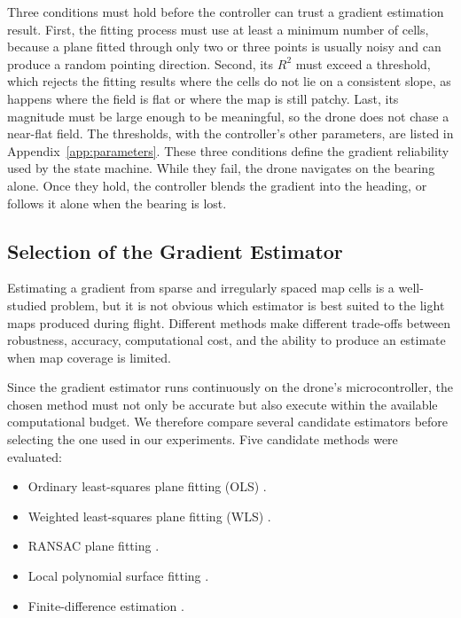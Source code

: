 Three conditions must hold before the controller can trust a gradient estimation result. First, the fitting process must use at least a minimum number of cells, because a plane fitted through only two or three points is usually noisy and can produce a random pointing direction. Second, its $R^2$ must exceed a threshold, which rejects the fitting results where the cells do not lie on a consistent slope, as happens where the field is flat or where the map is still patchy. Last, its magnitude must be large enough to be meaningful, so the drone does not chase a near-flat field. The thresholds, with the controller's other parameters, are listed in Appendix~\ref{app:parameters}. These three conditions define the gradient reliability used by the state machine. While they fail, the drone navigates on the bearing alone. Once they hold, the controller blends the gradient into the heading, or follows it alone when the bearing is lost.

\subsection{Selection of the Gradient Estimator}
\label{sec:gradient-estimator-comparison}

Estimating a gradient from sparse and irregularly spaced map cells is a well-studied problem, but it is not obvious which estimator is best suited to the light maps produced during flight. Different methods make different trade-offs between robustness, accuracy, computational cost, and the ability to produce an estimate when map coverage is limited.

Since the gradient estimator runs continuously on the drone's microcontroller, the chosen method must not only be accurate but also execute within the available computational budget. We therefore compare several candidate estimators before selecting the one used in our experiments. Five candidate methods were evaluated:

\begin{itemize}
    \item Ordinary least-squares plane fitting (OLS) \cite{bjorck1996lsq}.
    \item Weighted least-squares plane fitting (WLS) \cite{strutz2016wls}.
    \item RANSAC plane fitting \cite{fischler1981ransac}.
    \item Local polynomial surface fitting \cite{bjorck1996lsq}.
    \item Finite-difference estimation \cite{leveque2007fdm}.
\end{itemize}

